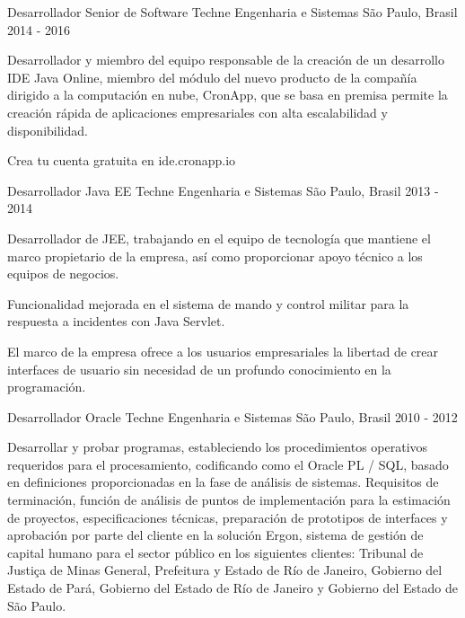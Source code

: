\begin{cventries}
  \cventry
    {Desarrollador Senior de Software} %
    {Techne Engenharia e Sistemas} %
    {São Paulo, Brasil} %
    {2014 - 2016} %
    {
      \begin{cvitems} %
        \item {Desarrollador y miembro del equipo responsable de la creación de un desarrollo IDE Java Online, miembro del módulo del nuevo producto de la compañía dirigido a la computación en nube, CronApp, que se basa en premisa permite la creación rápida de aplicaciones empresariales con alta escalabilidad y disponibilidad.}
        \item {Crea tu cuenta gratuita en ide.cronapp.io}
      \end{cvitems}
    }

  \cventry
    {Desarrollador Java EE} %
    {Techne Engenharia e Sistemas} %
    {São Paulo, Brasil} %
    {2013 - 2014} %
    {
      \begin{cvitems} %
        \item {Desarrollador de JEE, trabajando en el equipo de tecnología que mantiene el marco propietario de la empresa, así como proporcionar apoyo técnico a los equipos de negocios.}
        \item {Funcionalidad mejorada en el sistema de mando y control militar para la respuesta a incidentes con Java Servlet.}
        \item {El marco de la empresa ofrece a los usuarios empresariales la libertad de crear interfaces de usuario sin necesidad de un profundo conocimiento en la programación.}
      \end{cvitems}
    }

  \cventry
    {Desarrollador Oracle} %
    {Techne Engenharia e Sistemas} %
	{São Paulo, Brasil} %
    {2010 - 2012} %
    {
      \begin{cvitems} %
        \item {Desarrollar y probar programas, estableciendo los procedimientos operativos requeridos para el procesamiento, codificando como el Oracle PL / SQL, basado en definiciones proporcionadas en la fase de análisis de sistemas.
Requisitos de terminación, función de análisis de puntos de implementación para la estimación de proyectos, especificaciones técnicas, preparación de prototipos de interfaces y aprobación por parte del cliente en la solución Ergon, sistema de gestión de capital humano para el sector público en los siguientes clientes: Tribunal de Justiça de Minas General, Prefeitura y Estado de Río de Janeiro, Gobierno del Estado de Pará, Gobierno del Estado de Río de Janeiro y Gobierno del Estado de São Paulo.}
      \end{cvitems}
    }


\end{cventries}
